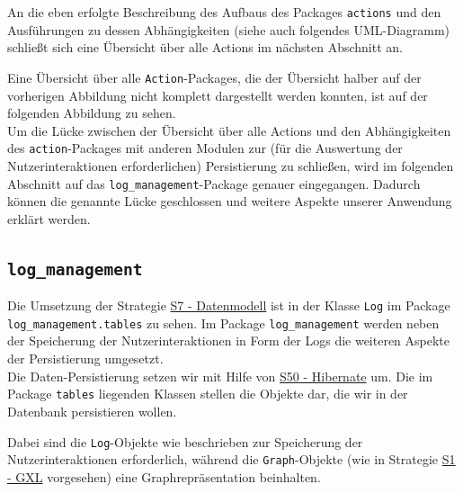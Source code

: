 \documentclass[enabledeprecatedfontcommands,fontsize=11pt,paper=a4,twoside]{scrartcl}
\newcounter{one}
\begin{document}
	An die eben erfolgte Beschreibung des Aufbaus des Packages \texttt{actions} und den Ausführungen zu dessen Abhängigkeiten (siehe auch folgendes UML-Diagramm) schließt sich eine Übersicht über alle Actions im nächsten Abschnitt an.
	
	
	
	Eine Übersicht über alle \texttt{Action}-Packages, die der Übersicht halber auf der vorherigen Abbildung nicht komplett dargestellt werden konnten, ist auf der folgenden Abbildung zu sehen. \\
	
	Um die Lücke zwischen der Übersicht über alle Actions und den Abhängigkeiten des \texttt{action}-Packages mit anderen Modulen zur (für die Auswertung der Nutzerinteraktionen erforderlichen) Persistierung zu schließen, wird im folgenden Abschnitt auf das \texttt{log\_management}-Package genauer eingegangen. Dadurch können die genannte Lücke geschlossen und weitere Aspekte unserer Anwendung erklärt werden. 
	
	
	
	
	\subsection{\texttt{log\_management}}
	
	Die Umsetzung der Strategie \hyperlink{aaa}{S7 - Datenmodell} ist in der Klasse \texttt{Log} im Package \texttt{log\_management.tables} zu sehen. Im Package \texttt{log\_management} werden neben der Speicherung der Nutzerinteraktionen in Form der Logs die weiteren Aspekte der Persistierung umgesetzt. \\
	Die Daten-Persistierung setzen wir mit Hilfe von \hyperlink{rrr}{S50 - Hibernate} um. Die im Package \texttt{tables} liegenden Klassen stellen die Objekte dar, die wir in der Datenbank persistieren wollen. 
	
	
	
	Dabei sind die \texttt{Log}-Objekte wie beschrieben zur Speicherung der Nutzerinteraktionen erforderlich, während die \texttt{Graph}-Objekte (wie in Strategie \hyperlink{yy}{S1 - GXL} vorgesehen) eine Graphrepräsentation beinhalten. \\
	
\end{document}
